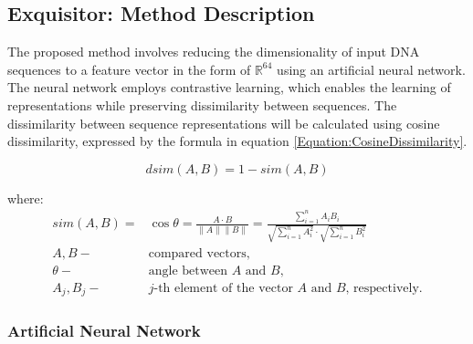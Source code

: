 \documentclass[pdflatex,sn-vancouver-num]{sn-jnl}%
\begin{document}


    \subsection{Exquisitor: Method Description}

    The proposed method involves reducing the dimensionality of input DNA sequences to a feature vector in the form of $\mathbb{R}^{64}$ using an artificial neural network.
    The neural network employs contrastive learning, which enables the learning of representations while preserving dissimilarity between sequences.
    The dissimilarity between sequence representations will be calculated using cosine dissimilarity, expressed by the formula in equation \eqref{Equation:CosineDissimilarity}.

            \begin{equation}
                dsim(A, B) = 1 - sim(A, B)
                \label{Equation:CosineDissimilarity}
            \end{equation}

            where:
            \begin{align*}
                sim(A, B) =& \cos{\theta} = \frac{A \cdot B}{\|A\| \|B\|} = \frac{
                    \sum^{n}_{i = 1}A_i B_i
                }{
                    \sqrt{
                        \sum^{n}_{i = 1}A_i^2
                    }
                    \cdot
                    \sqrt{
                        \sum^{n}_{i = 1}B_i^2
                    }
                } \\
                A, B -& \text{compared vectors,} \\
                \theta -& \text{angle between $A$ and $B$,} \\
                A_j, B_j -& \text{$j$-th element of the vector $A$ and $B$, respectively.}
            \end{align*}

            \subsubsection{Artificial Neural Network}
\end{document}
